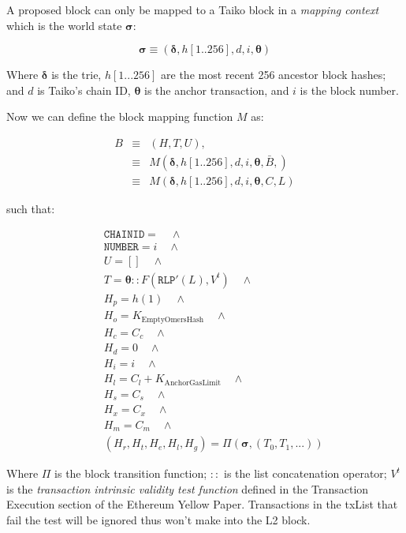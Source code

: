 \documentclass[9pt,oneside]{amsart}
\begin{document}
\begin{multicols}{2}
A proposed block can only be mapped to a Taiko block in a \textit{mapping context} which is the world state $\boldsymbol{\sigma}$:

$$\boldsymbol{\sigma} \equiv (\boldsymbol{\delta}, h[1..256], d, i, \boldsymbol{\theta})$$

Where $\boldsymbol{\delta}$ is the trie, $h[1...256]$ are the most recent 256 ancestor block hashes; and $d$ is Taiko's chain ID, $\boldsymbol{\theta}$ is the anchor transaction, and $i$ is the block number.

Now we can define the block mapping function $M$ as:

\begin{eqnarray}
B & \equiv & (H, T, U), \\
\nonumber & \equiv &  M(\boldsymbol{\delta}, h[1..256], {d}, i, \boldsymbol{\theta}, \bar{B}, )  \\
\nonumber & \equiv & M(\boldsymbol{\delta}, h[1..256], {d}, i, \boldsymbol{\theta}, C, L)
\end{eqnarray}


such that:

\begin{eqnarray}
& & \texttt{CHAINID}  = \quad \wedge \\
\nonumber& & \texttt{NUMBER} = {i} \quad \wedge \\
\nonumber& & U = [] \quad \wedge \\
\nonumber& & T =  \boldsymbol{\theta}::F(\texttt{RLP}'(L), V^t) \quad \wedge  \\
\nonumber& & H_p =  h(1) \quad \wedge \\
\nonumber& & H_o =   K_{\mathrm{EmptyOmersHash}} \quad \wedge \\
\nonumber& & H_c =   C_c \quad \wedge \\
\nonumber& & H_d =   0 \quad \wedge \\
\nonumber& & H_i =   i \quad \wedge \\
\nonumber& & H_l =   C_l + K_{\mathrm{AnchorGasLimit}} \quad \wedge \\
\nonumber& & H_s =   C_s \quad \wedge \\
\nonumber& & H_x =   C_x \quad \wedge \\
\nonumber& & H_m =   C_m \quad \wedge \\
\nonumber& & (H_r, H_t, H_e, H_l, H_g) =   \Pi(\boldsymbol{\sigma}, (T_0, T_1, ...))
\end{eqnarray}

Where $\Pi$ is the block transition function; $::$ is the list concatenation operator; $V^t$ is the \textit{transaction intrinsic validity test function} defined in the Transaction Execution section of the Ethereum Yellow Paper. Transactions in the txList that fail the test will be ignored thus won't make into the L2 block.



\end{multicols}
\end{document}
